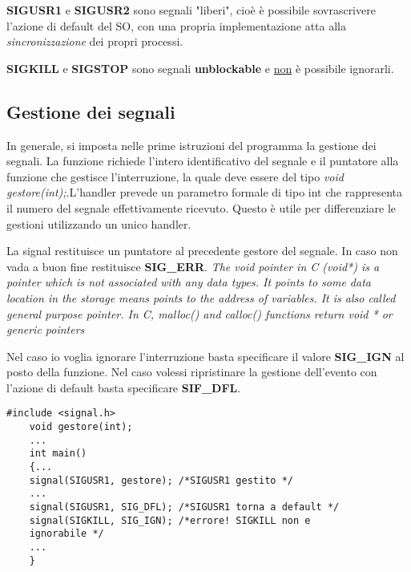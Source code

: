 \documentclass{article}
\begin{document}
\noindent \textbf{SIGUSR1} e \textbf{SIGUSR2} sono segnali "liberi", cioè è
possibile sovrascrivere l'azione di default del SO, con una propria 
implementazione atta alla \textit{sincronizzazione} dei propri processi.

\noindent \textbf{SIGKILL} e \textbf{SIGSTOP} sono segnali \textbf{unblockable}
e \underline{non} è possibile ignorarli.


\subsection{Gestione dei segnali}
\noindent{}
\medskip

\noindent In generale, si imposta nelle prime istruzioni del programma 
la gestione dei segnali. La funzione richiede l'intero
 identificativo del segnale e il puntatore alla
 funzione che gestisce l'interruzione, la quale deve essere del 
 tipo \textit{void gestore(int);}.L'handler prevede un parametro formale 
di tipo int che rappresenta il numero del segnale effettivamente
 ricevuto. Questo è utile per differenziare le gestioni utilizzando 
 un unico handler.

\noindent La signal restituisce un puntatore al precedente gestore del segnale.
In caso non vada a buon fine restituisce \textbf{SIG\_ERR}.
\textit{The void pointer in C (void*) is a pointer which is not
 associated with any data types. It points to some data 
 location in the storage means points to the address of 
 variables. It is also called general purpose pointer. In C, malloc() 
and calloc() functions return void * or generic pointers}
\medskip

\noindent Nel caso io voglia ignorare l'interruzione basta 
specificare il valore \textbf{SIG\_IGN} al posto della
funzione. Nel caso volessi ripristinare 
la gestione dell'evento con l'azione di default 
basta specificare \textbf{SIF\_DFL}.

\begin{lstlisting}[style=CStyle]
    #include <signal.h>
    void gestore(int);
    ...
    int main()
    {...
    signal(SIGUSR1, gestore); /*SIGUSR1 gestito */
    ...
    signal(SIGUSR1, SIG_DFL); /*SIGUSR1 torna a default */
    signal(SIGKILL, SIG_IGN); /*errore! SIGKILL non e
    ignorabile */
    ...
    }
\end{lstlisting}
\end{document}
